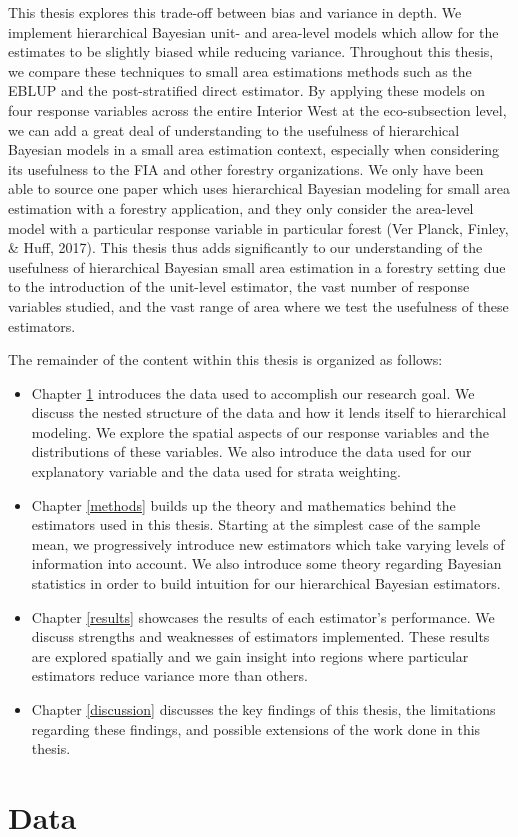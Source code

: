 \documentclass[12pt,twoside]{reedthesis}
\providecommand{\tightlist}{%
  \setlength{\itemsep}{0pt}\setlength{\parskip}{0pt}}
\begin{document}
This thesis explores this trade-off between bias and variance in depth. We implement hierarchical Bayesian unit- and area-level models which allow for the estimates to be slightly biased while reducing variance. Throughout this thesis, we compare these techniques to small area estimations methods such as the EBLUP and the post-stratified direct estimator. By applying these models on four response variables across the entire Interior West at the eco-subsection level, we can add a great deal of understanding to the usefulness of hierarchical Bayesian models in a small area estimation context, especially when considering its usefulness to the FIA and other forestry organizations. We only have been able to source one paper which uses hierarchical Bayesian modeling for small area estimation with a forestry application, and they only consider the area-level model with a particular response variable in particular forest (Ver Planck, Finley, \& Huff, 2017). This thesis thus adds significantly to our understanding of the usefulness of hierarchical Bayesian small area estimation in a forestry setting due to the introduction of the unit-level estimator, the vast number of response variables studied, and the vast range of area where we test the usefulness of these estimators.

The remainder of the content within this thesis is organized as follows:
\begin{itemize}
\tightlist
\item
  Chapter \ref{data} introduces the data used to accomplish our research goal. We discuss the nested structure of the data and how it lends itself to hierarchical modeling. We explore the spatial aspects of our response variables and the distributions of these variables. We also introduce the data used for our explanatory variable and the data used for strata weighting.
\item
  Chapter \ref{methods} builds up the theory and mathematics behind the estimators used in this thesis. Starting at the simplest case of the sample mean, we progressively introduce new estimators which take varying levels of information into account. We also introduce some theory regarding Bayesian statistics in order to build intuition for our hierarchical Bayesian estimators.
\item
  Chapter \ref{results} showcases the results of each estimator's performance. We discuss strengths and weaknesses of estimators implemented. These results are explored spatially and we gain insight into regions where particular estimators reduce variance more than others.
\item
  Chapter \ref{discussion} discusses the key findings of this thesis, the limitations regarding these findings, and possible extensions of the work done in this thesis.
\end{itemize}
\hypertarget{data}{%
\chapter{Data}\label{data}}
\end{document}
